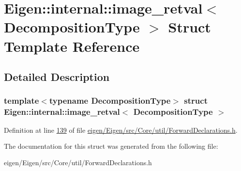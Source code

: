 \hypertarget{struct_eigen_1_1internal_1_1image__retval}{}\section{Eigen\+:\+:internal\+:\+:image\+\_\+retval$<$ Decomposition\+Type $>$ Struct Template Reference}
\label{struct_eigen_1_1internal_1_1image__retval}


\subsection{Detailed Description}
\subsubsection*{template$<$typename Decomposition\+Type$>$\newline
struct Eigen\+::internal\+::image\+\_\+retval$<$ Decomposition\+Type $>$}



Definition at line \hyperlink{eigen_2_eigen_2src_2_core_2util_2_forward_declarations_8h_source_l00139}{139} of file \hyperlink{eigen_2_eigen_2src_2_core_2util_2_forward_declarations_8h_source}{eigen/\+Eigen/src/\+Core/util/\+Forward\+Declarations.\+h}.



The documentation for this struct was generated from the following file\+:\begin{DoxyCompactItemize}
\item 
eigen/\+Eigen/src/\+Core/util/\+Forward\+Declarations.\+h\end{DoxyCompactItemize}
